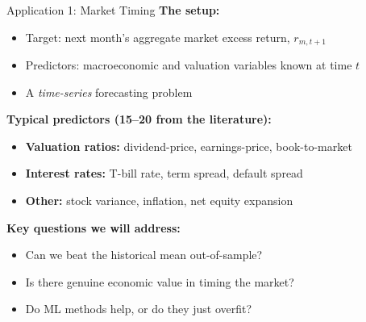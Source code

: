 \documentclass[10pt]{beamer}
\begin{document}
\begin{frame}{Application 1: Market Timing}
  \textbf{The setup:}
  \begin{itemize}
    \item Target: next month's aggregate market excess return, $r_{m,t+1}$
    \item Predictors: macroeconomic and valuation variables known at time $t$
    \item A \emph{time-series} forecasting problem
  \end{itemize}

  \vspace{0.5em}
  \textbf{Typical predictors (15--20 from the literature):}
  \begin{itemize}
    \item \textbf{Valuation ratios:} dividend-price, earnings-price, book-to-market
    \item \textbf{Interest rates:} T-bill rate, term spread, default spread
    \item \textbf{Other:} stock variance, inflation, net equity expansion
  \end{itemize}

  \vspace{0.5em}
  \textbf{Key questions we will address:}
  \begin{itemize}
    \item Can we beat the historical mean out-of-sample?
    \item Is there genuine economic value in timing the market?
    \item Do ML methods help, or do they just overfit?
  \end{itemize}
\end{frame}
\end{document}
